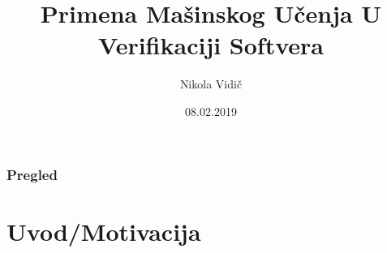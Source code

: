 \documentclass[14pt]{beamer}
\title[]{Primena Mašinskog Učenja U Verifikaciji Softvera} %
\author{Nikola Vidič} %
\institute[Matematički fakultet] %
{
Matematički fakultet \\ %
\medskip
}
\date{08.02.2019} %
\begin{document}
\begin{frame}
\titlepage %
\end{frame}

\begin{frame}
\frametitle{Pregled} %
\tableofcontents %
\end{frame}


\section{Uvod/Motivacija} %



\end{document}
